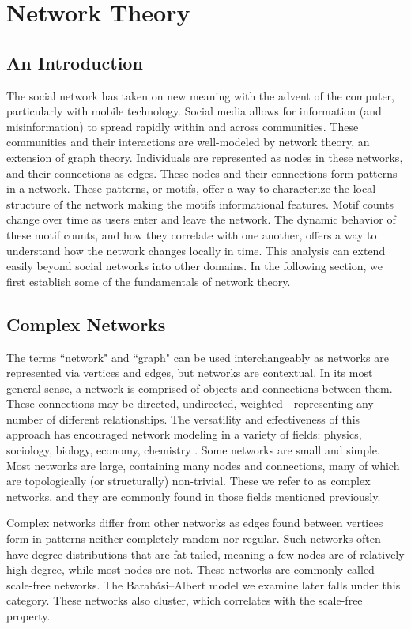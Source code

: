 \chapter{Network Theory}

\section{An Introduction}
The social network has taken on new meaning with the advent of the computer, particularly with 
mobile technology. Social media allows for information (and misinformation) to spread rapidly
within and across communities. These communities and their interactions are well-modeled by network theory, an extension of graph theory.
Individuals are represented as nodes in these networks, and their connections as edges. These nodes and their
connections form patterns in a network. These patterns, or motifs, offer
a way to characterize the local structure of the network making the motifs informational features. Motif counts change
over time as users enter and leave the network. The dynamic behavior of these motif counts, and how they correlate with 
one another, offers a way to understand how the network changes locally in time. This analysis can 
extend easily beyond social networks into other domains. In the following section, we first establish 
some of the fundamentals of network theory.


\section{Complex Networks}
The terms ``network" and ``graph" can be used interchangeably as networks are represented
via vertices and edges, but networks are contextual. In its 
most general sense, a network is comprised of objects and connections between them. These
connections may be directed, undirected, weighted - representing any number of different relationships. 
The versatility and effectiveness of this approach has encouraged network modeling in a 
variety of fields: physics, sociology, biology, economy, chemistry \cite{Newman2010}.
Some networks are small and simple. Most networks are large, containing many nodes and connections, many of which are
topologically (or structurally) non-trivial. These we refer to as complex networks, and they are 
commonly found in those fields mentioned previously. 

Complex networks differ from other networks as edges found between vertices 
form in patterns neither completely random nor regular. Such networks often have degree distributions that are fat-tailed,
meaning a few nodes are of relatively high degree, while most nodes are not. These networks
are commonly called scale-free networks. The Barabási–Albert model we examine later falls under
this category. These networks also cluster, which correlates with the scale-free 
property. 

